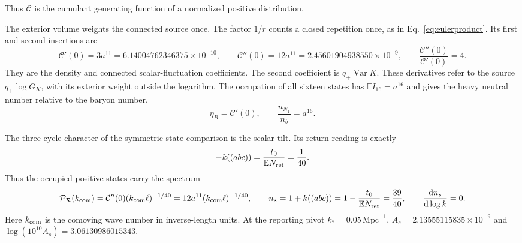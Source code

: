 \documentclass[aps,prx,onecolumn,10pt,notitlepage,nofootinbib,longbibliography]{revtex4-2}
\numberwithin{equation}{section}
\numberwithin{table}{section}
\newcommand{\EE}{\mathbb E}
\newcommand{\Var}{\operatorname{Var}}
\newcommand{\dd}{\mathrm d}
\begin{document}
Thus $\mathcal C$ is the cumulant generating function of a normalized positive distribution.

The exterior volume weights the connected source once. The factor $1/r$
counts a closed repetition once, as in Eq.~\eqref{eq:eulerproduct}. Its first
and second insertions are
\begin{equation}
 \mathcal C'(0)=3a^{11}=6.14004762346375\times10^{-10},\qquad
 \mathcal C''(0)=12a^{11}=2.45601904938550\times10^{-9},
 \qquad \frac{\mathcal C''(0)}{\mathcal C'(0)}=4.
 \label{eq:threeandtwelve}
\end{equation}
They are the density and connected scalar-fluctuation coefficients. The
second coefficient is $q_+\Var K$. These derivatives refer to the source
$q_+\log G_K$, with its exterior weight outside the logarithm. The occupation
of all sixteen states has $\EE I_{16}=a^{16}$ and gives the heavy neutral
number relative to the baryon number.
\begin{equation}
 \eta_B=\mathcal C'(0),\qquad
 \frac{n_{N_1}}{n_b}=a^{16}.
 \label{eq:populationreadings}
\end{equation}

The three-cycle character of the symmetric-state comparison is the scalar tilt. Its return reading is exactly
\begin{equation}
 -k((abc))=\frac{t_0}{\EE N_{\rm ret}}=\frac1{40}.
 \label{eq:tiltidentity}
\end{equation}
Thus the occupied positive states carry the spectrum
\begin{equation}
 \mathcal P_{\mathcal R}(k_{\rm com})=\mathcal C^{\prime\prime}(0)(k_{\rm com}\ell)^{-1/40}
 =12a^{11}(k_{\rm com}\ell)^{-1/40},\qquad
 n_s=1+k((abc))=1-\frac{t_0}{\EE N_{\rm ret}}=\frac{39}{40},\qquad
 \frac{\dd n_s}{\dd\log k}=0.
 \label{eq:primordial}
\end{equation}
Here $k_{\rm com}$ is the comoving wave number in inverse-length units. At the reporting pivot $k_*=0.05\,\mathrm{Mpc}^{-1}$, $A_s=2.13555115835\times10^{-9}$ and $\log(10^{10}A_s)=3.06130986015343$.
\end{document}
